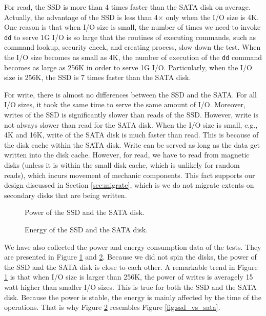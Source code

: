 For read, the SSD is more than 4 times faster than the SATA disk on
average. Actually, the advantage of the SSD is less than 4$\times$
only when the I/O size is 4K.  One reason is that when I/O size is
small, the number of times we need to invoke \texttt{dd} to serve 1G
I/O is so large that the routines of executing commands, such as
command lookup, security check, and creating process, slow down the
test.  When the I/O size becomes as small as 4K, the number of
execution of the \texttt{dd} command becomes as large as 256K in order
to serve 1G I/O.  Particularly, when the I/O size is 256K, the SSD is
7 times faster than the SATA disk. 

For write, there is almost no differences between the SSD and the
SATA. For all I/O sizes, it took the same time to serve the same
amount of I/O. Moreover, writes of the SSD is significantly slower
than reads of the SSD.  However, write is not always slower than read
for the SATA disk. When the I/O size is small, e.g., 4K and 16K, write
of the SATA disk is much faster than read. This is because of the disk
cache within the SATA disk. Write can be served as long as the data
get written into the disk cache. However, for read, we have to read
from magnetic disks (unless it is within the small disk cache, which
is unlikely for random reads), which incurs movement of mechanic
components. This fact supports our design discussed in Section
\ref{sec:migrate}, which is we do not migrate extents on secondary
disks that are being written. 

\begin{figure}[t]
\begin{centering}
\caption{Power of the SSD and the SATA disk.}
\label{fig:power}
\end{centering}
\end{figure}

\begin{figure}[t]
\begin{centering}
\caption{Energy of the SSD and the SATA disk.}
\label{fig:energy}
\end{centering}
\end{figure}

We have also collected the power and energy consumption data of the
tests. They are presented in Figure \ref{fig:power} and
\ref{fig:energy}. Because we did not spin the disks, the power of the
SSD and the SATA disk is close to each other. A remarkable trend in 
Figure \ref{fig:power} is that when I/O size is larger than 256K, the
power of writes is averagely 15 watt higher than smaller I/O sizes.
This is true for both the SSD and the SATA disk. Because the power is
stable, the energy is mainly affected by the time of the operations.
That is why Figure \ref{fig:energy} resembles Figure
\ref{fig:ssd_vs_sata}. 

